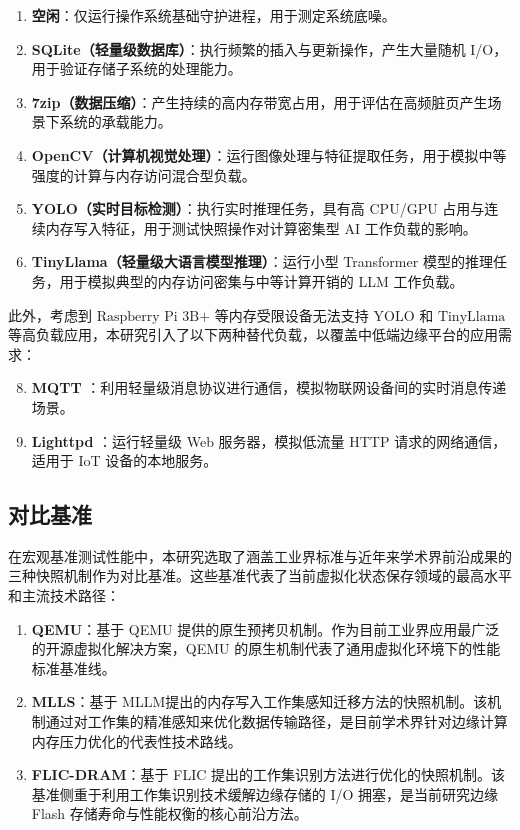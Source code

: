 \begin{enumerate}
  \item \textbf{空闲}：仅运行操作系统基础守护进程，用于测定系统底噪。
  \item \textbf{SQLite（轻量级数据库）\cite{bhosale2015sqlite}}：执行频繁的插入与更新操作，产生大量随机 I/O，用于验证存储子系统的处理能力。
  \item \textbf{7zip（数据压缩）\cite{7zip}}：产生持续的高内存带宽占用，用于评估在高频脏页产生场景下系统的承载能力。
  \item \textbf{OpenCV（计算机视觉处理）\cite{bradski2000opencv}}：运行图像处理与特征提取任务，用于模拟中等强度的计算与内存访问混合型负载。
  \item \textbf{YOLO（实时目标检测）\cite{wang2023yolov7}}：执行实时推理任务，具有高 CPU/GPU 占用与连续内存写入特征，用于测试快照操作对计算密集型 AI 工作负载的影响。
  \item \textbf{TinyLlama（轻量级大语言模型推理）\cite{zhang2024tinyllama}}：运行小型 Transformer 模型的推理任务，用于模拟典型的内存访问密集与中等计算开销的 LLM 工作负载。
\end{enumerate}

此外，考虑到 $\text{Raspberry Pi 3B+}$ 等内存受限设备无法支持 $\text{YOLO}$ 和 $\text{TinyLlama}$ 等高负载应用，本研究引入了以下两种替代负载，以覆盖中低端边缘平台的应用需求：

\begin{enumerate}
    \setcounter{enumi}{7} %
    \item \textbf{MQTT} \cite{hillar2017mqtt}：利用轻量级消息协议进行通信，模拟物联网设备间的实时消息传递场景。
    \item \textbf{Lighttpd} \cite{bogus2008lighttpd}：运行轻量级 Web 服务器，模拟低流量 HTTP 请求的网络通信，适用于 IoT 设备的本地服务。
\end{enumerate}

\subsection{对比基准}

在宏观基准测试性能中，本研究选取了涵盖工业界标准与近年来学术界前沿成果的三种快照机制作为对比基准。这些基准代表了当前虚拟化状态保存领域的最高水平和主流技术路径：  

\begin{enumerate}

\item \textbf{QEMU}：基于 QEMU\cite{bellard2005qemu} 提供的原生预拷贝机制。作为目前工业界应用最广泛的开源虚拟化解决方案，QEMU 的原生机制代表了通用虚拟化环境下的性能标准基准线。
\item \textbf{MLLS}：基于 MLLM\cite{shi2022memory}提出的内存写入工作集感知迁移方法的快照机制。该机制通过对工作集的精准感知来优化数据传输路径，是目前学术界针对边缘计算内存压力优化的代表性技术路线。
\item \textbf{FLIC-DRAM}：基于 FLIC\cite{zhong2016flic} 提出的工作集识别方法进行优化的快照机制。该基准侧重于利用工作集识别技术缓解边缘存储的 I/O 拥塞，是当前研究边缘 Flash 存储寿命与性能权衡的核心前沿方法。

\end{enumerate}

